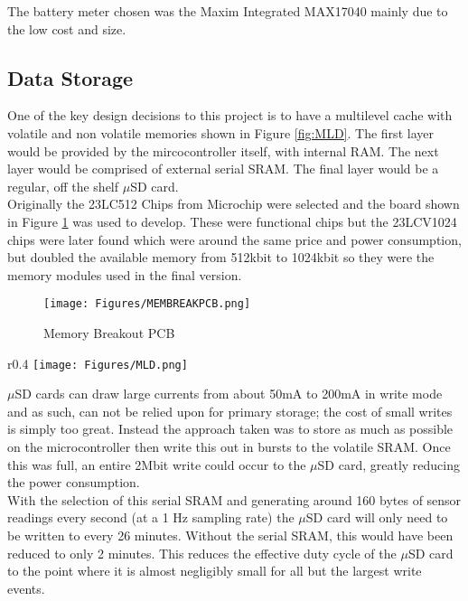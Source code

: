 \documentclass[12pt,openany,a4paper]{book}
\begin{document}
			The battery meter chosen was the Maxim Integrated MAX17040 \cite{max17} mainly due to the low cost and size. %
			
		\newpage
		\subsection{Data Storage}
		One of the key design decisions to this project is to have a multilevel cache with volatile and non volatile memories shown in Figure \ref{fig:MLD}. The first layer would be provided by the mircocontroller itself, with internal RAM. The next layer would be comprised of external serial SRAM. The final layer would be a regular, off the shelf $\mu$SD card. \\
		
		Originally the 23LC512 Chips from Microchip were selected and the board shown in Figure \ref{fig:MEMBREAKPCB} was used to develop. These were functional chips but the 23LCV1024 chips were later found which were around the same price and power consumption, but doubled the available memory from 512kbit to 1024kbit so they were the memory modules used in the final version. \\
		
		\begin{figure}[H]
			\centering
			\texttt{[image: Figures/MEMBREAKPCB.png]}
			\caption{Memory Breakout PCB}
			\label{fig:MEMBREAKPCB}
		\end{figure}	
		
				
				\begin{wrapfigure}{r}{0.4\textwidth}
					\centering
					\texttt{[image: Figures/MLD.png]}
					\caption{Memory Architecture}
					\label{fig:MLD}
				\end{wrapfigure}
		
		$\mu$SD cards can draw large currents from about 50mA to 200mA in write mode \cite{Sandisk} and as such, can not be relied upon for primary storage; the cost of small writes is simply too great. Instead the approach taken was to store as much as possible on the microcontroller then write this out in bursts to the volatile SRAM. Once this was full, an entire 2Mbit write could occur to the $\mu$SD card, greatly reducing the power consumption. \\
		
		With the selection of this serial SRAM and generating around 160 bytes of sensor readings every second (at a 1 Hz sampling rate) the $\mu$SD card will only need to be written to every 26 minutes. Without the serial SRAM, this would have been reduced to only 2 minutes. This reduces the effective duty cycle of the $\mu$SD card to the point where it is almost negligibly small for all but the largest write events.
		
\end{document}
